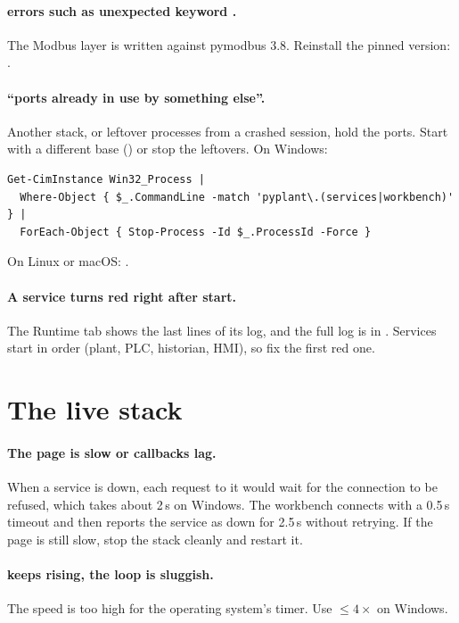 \paragraph{ errors such as unexpected keyword
.} The Modbus layer is written against pymodbus 3.8. Reinstall
the pinned version: .

\paragraph{``ports already in use by something else''.} Another stack, or
leftover processes from a crashed session, hold the ports. Start with a
different base () or stop the leftovers. On Windows:
\begin{lstlisting}[style=sh]
Get-CimInstance Win32_Process |
  Where-Object { $_.CommandLine -match 'pyplant\.(services|workbench)' } |
  ForEach-Object { Stop-Process -Id $_.ProcessId -Force }
\end{lstlisting}
On Linux or macOS: .

\paragraph{A service turns red right after start.} The Runtime tab shows the
last lines of its log, and the full log is in .
Services start in order (plant, PLC, historian, HMI), so fix the first red one.

\section{The live stack}

\paragraph{The page is slow or callbacks lag.} When a service is down, each
request to it would wait for the connection to be refused, which takes about
2\,s on Windows. The workbench connects with a 0.5\,s timeout and then reports
the service as down for 2.5\,s without retrying. If the page is still slow,
stop the stack cleanly and restart it.

\paragraph{ keeps rising, the loop is sluggish.} The speed
is too high for the operating system's timer. Use $\le4\times$ on Windows.

